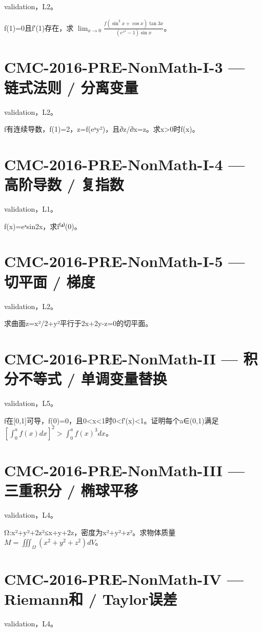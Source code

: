 \documentclass[UTF8]{ctexart}
\begin{document}
validation，L2。

f(1)=0且f′(1)存在，求 $\lim_{x\to0}\frac{f(\sin^2x+\cos x)\tan3x}{(e^{x^2}-1)\sin x}$。

\section*{CMC-2016-PRE-NonMath-I-3 — 链式法则 / 分离变量}

validation，L2。

f有连续导数，f(1)=2，z=f(eˣy²)，且∂z/∂x=z。求x>0时f(x)。

\section*{CMC-2016-PRE-NonMath-I-4 — 高阶导数 / 复指数}

validation，L1。

f(x)=eˣsin2x，求f⁽⁴⁾(0)。

\section*{CMC-2016-PRE-NonMath-I-5 — 切平面 / 梯度}

validation，L2。

求曲面z=x²/2+y²平行于2x+2y-z=0的切平面。

\section*{CMC-2016-PRE-NonMath-II — 积分不等式 / 单调变量替换}

validation，L5。

f在[0,1]可导，f(0)=0，且0<x<1时0<f′(x)<1。证明每个a∈(0,1)满足 $[\int_0^a f(x)dx]^2>\int_0^af(x)^3dx$。

\section*{CMC-2016-PRE-NonMath-III — 三重积分 / 椭球平移}

validation，L4。

Ω:x²+y²+2z²≤x+y+2z，密度为x²+y²+z²。求物体质量 $M=\iiint_\Omega(x^2+y^2+z^2)dV$。

\section*{CMC-2016-PRE-NonMath-IV — Riemann和 / Taylor误差}

validation，L4。
\end{document}
